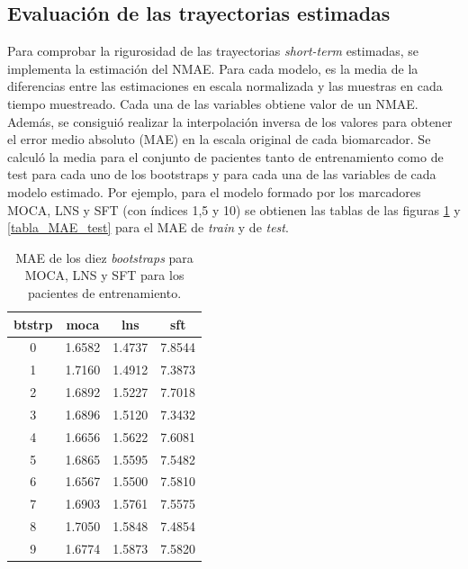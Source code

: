 \subsection{Evaluación de las trayectorias estimadas}
Para comprobar la rigurosidad de las trayectorias \textit{short-term} estimadas, se implementa la estimación del NMAE. Para cada modelo, es la media de la diferencias entre las estimaciones en escala normalizada y las muestras en cada tiempo muestreado. Cada una de las variables obtiene valor de un NMAE.\\

Además, se consiguió realizar la interpolación inversa de los valores para obtener el error medio absoluto (MAE) en la escala original de cada biomarcador. Se calculó la media para el conjunto de pacientes tanto de entrenamiento como de test para cada uno de los bootstraps y para cada una de las variables de cada modelo estimado. Por ejemplo, para el modelo formado por los marcadores MOCA, LNS y SFT (con índices 1,5 y 10) se obtienen las tablas de las figuras \ref{tabla_MAE_train} y \ref{tabla_MAE_test} para el MAE de \textit{train} y de \textit{test}. \\

\begin{table}[h!]
	\centering
	\begin{tabular}{|c|c|c|c|}
		\hline
		btstrp & \textbf{moca} & \textbf{lns} & \textbf{sft} \\ \hline
		0 & 1.6582 & 1.4737 & 7.8544 \\ \hline
		1 & 1.7160 & 1.4912 & 7.3873 \\ \hline
		2 & 1.6892 & 1.5227 & 7.7018 \\ \hline
		3 & 1.6896 & 1.5120 & 7.3432 \\ \hline
		4 & 1.6656 & 1.5622 & 7.6081 \\ \hline
		5 & 1.6865 & 1.5595 & 7.5482 \\ \hline
		6 & 1.6567 & 1.5500 & 7.5810 \\ \hline
		7 & 1.6903 & 1.5761 & 7.5575 \\ \hline
		8 & 1.7050 & 1.5848 & 7.4854 \\ \hline
		9 & 1.6774 & 1.5873 & 7.5820 \\ \hline
	\end{tabular}
	\caption{MAE de los diez \textit{bootstraps} para MOCA, LNS y SFT para los pacientes de entrenamiento.}
	\label{tabla_MAE_train}
\end{table}

